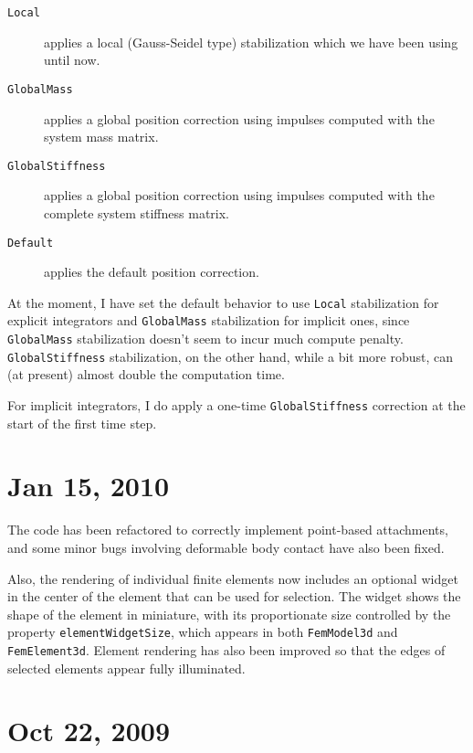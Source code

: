 \documentclass{article}
\begin{document}
\begin{description}

\item[{\tt Local}]  \mbox{}
 applies a local (Gauss-Seidel type) stabilization which we have been using 
 until now.

\item[{\tt GlobalMass}]  \mbox{}
 applies a global position correction using impulses computed with the
 system mass matrix.

\item[{\tt GlobalStiffness}] \mbox{}
 applies a global position correction using impulses computed with the
 complete system stiffness matrix.

\item[{\tt Default}] \mbox{}
 applies the default position correction.

\end{description}

At the moment, I have set the default behavior to use {\tt Local}
stabilization for explicit integrators and {\tt GlobalMass} stabilization
for implicit ones, since {\tt GlobalMass} stabilization doesn't seem to
incur much compute penalty. {\tt GlobalStiffness} stabilization, on the
other hand, while a bit more robust, can (at present) almost double
the computation time.

For implicit integrators, I do apply a one-time {\tt GlobalStiffness}
correction at the start of the first time step.

\section*{Jan 15, 2010}

The code has been refactored to correctly implement point-based
attachments, and some minor bugs involving deformable body contact
have also been fixed.

Also, the rendering of individual finite elements now includes an
optional widget in the center of the element that can be used for
selection. The widget shows the shape of the element in miniature,
with its proportionate size controlled by the property
{\tt elementWidgetSize}, which appears in both {\tt FemModel3d} and
{\tt FemElement3d}. Element rendering has also been improved so that the
edges of selected elements appear fully illuminated.

\section*{Oct 22, 2009}
\end{document}
